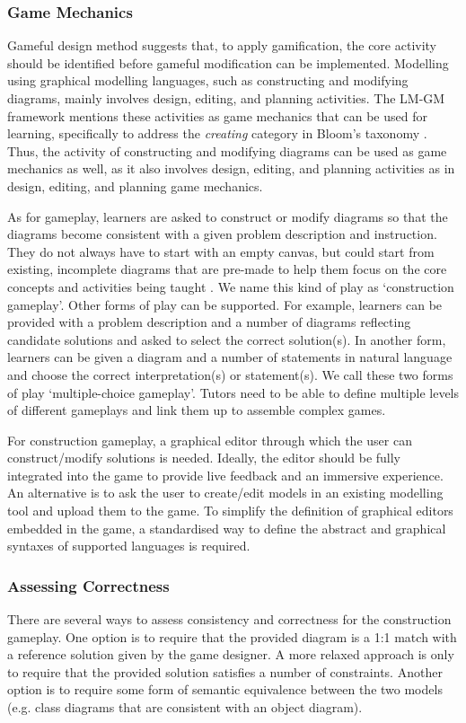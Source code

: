 \documentclass[conference]{IEEEtran}
\begin{document}
\subsubsection{Game Mechanics} 
\label{Game Mechanics} 
Gameful design method \cite{deterding2015lens} suggests that, to apply gamification, the core activity should be identified before gameful modification can be implemented. Modelling using graphical modelling languages, such as constructing and modifying diagrams, mainly involves design, editing, and planning activities. The LM-GM framework \cite{arnab2015mapping} mentions these activities as game mechanics that can be used for learning, specifically to address the \emph{creating} category in Bloom's taxonomy \cite{krathwohl2002revision}. Thus, the activity of constructing and modifying diagrams can be used as game mechanics as well, as it also involves design, editing, and planning activities as in design, editing, and planning game mechanics.

As for gameplay, learners are asked to construct or modify diagrams so that the diagrams become consistent with a given problem description and instruction. They do not always have to start with an empty canvas, but could start from existing, incomplete diagrams that are pre-made to help them focus on the core concepts and activities being taught \cite{deterding2015lens}. We name this kind of play as `construction gameplay'. Other forms of play can be supported. For example, learners can be provided with a problem description and a number of diagrams reflecting candidate solutions and asked to select the correct solution(s). In another form, learners can be given a diagram and a number of statements in natural language and choose the correct interpretation(s) or statement(s). We call these two forms of play `multiple-choice gameplay'. Tutors need to be able to define multiple levels of different gameplays and link them up to assemble complex games. 

For construction gameplay, a graphical editor through which the user can construct/modify solutions is needed. Ideally, the editor should be fully integrated into the game to provide live feedback and an immersive experience. An alternative is to ask the user to create/edit models in an existing modelling tool and upload them to the game. To simplify the definition of graphical editors embedded in the game, a standardised way to define the abstract and graphical syntaxes of supported languages is required. 

\subsubsection{Assessing Correctness} 
\label{Assessing Correctness} 
There are several ways to assess consistency and correctness for the construction gameplay. One option is to require that the provided diagram is a 1:1 match with a reference solution given by the game designer. A more relaxed approach is only to require that the provided solution satisfies a number of constraints. Another option is to require some form of semantic equivalence between the two models (e.g. class diagrams that are consistent with an object diagram). 
\end{document}
